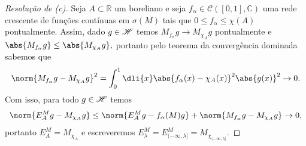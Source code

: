 \begin{proof}[Resolução de (c)]
  Seja \(A \subset \mathbb{R}\) um boreliano e seja \(f_\alpha \in \mathcal{C}([0,1],\mathbb{C})\) uma rede crescente de funções contínuas em \(\sigma(M)\) tais que \(0 \leq f_\alpha \leq \chi(A)\) pontualmente. Assim, dado \(g \in \mathscr{H}\) temos \(M_{f_\alpha}g \to M_{\chi_A}g\) pontualmente e \(\abs{M_{f_\alpha}g} \leq \abs{M_{\chi_A}g},\) portanto pelo teorema da convergência dominada sabemos que
  \begin{equation*}
    \norm{M_{f_\alpha}g - M_{\chi_A}g}^2 = \int_0^1\dli{x} \abs{f_\alpha(x) - \chi_A(x)}^2\abs{g(x)}^2 \to 0.
  \end{equation*}
  Com isso, para todo \(g \in \mathscr{H}\) temos
  \begin{equation*}
    \norm{E_A^Mg - M_{\chi_A}g} \leq \norm{E_A^Mg - f_\alpha(M)g} + \norm{M_{f_\alpha}g - M_{\chi_A}g} \to 0,
  \end{equation*}
  portanto \(E_A^M = M_{\chi_A}\) e escreveremos \(E^M_\lambda = E^M_{(-\infty,\lambda]} = M_{\chi_{(-\infty,\lambda]}}.\)
\end{proof}
